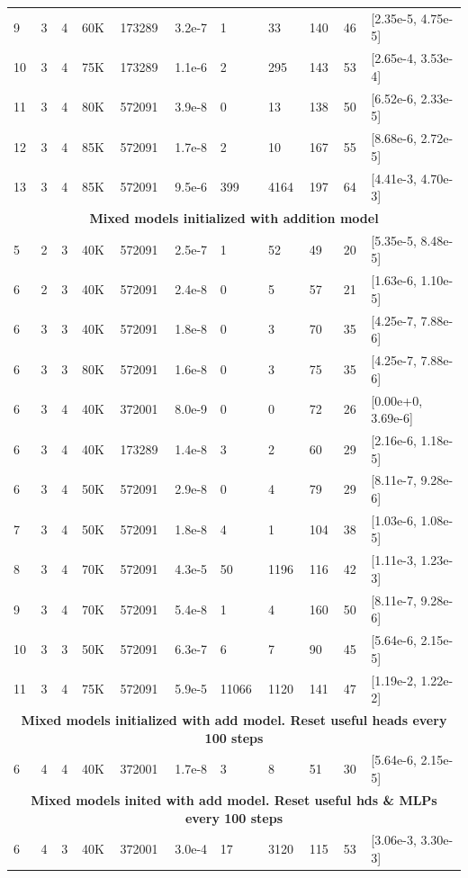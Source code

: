\documentclass[11pt]{article}
\begin{document}
\begin{table}[t]
\begin{tabularx}{\textwidth}{|p{0.3cm}|p{0.3cm}|p{0.3cm}|p{0.8cm}|p{0.9cm}|p{1cm}|p{1.4cm}|p{1.4cm}|p{0.8cm}|p{0.8cm}|X|}
    9 & 3 & 4 & 60K & 173289 & 3.2e-7 & 1 & 33 & 140 & 46 & [2.35e-5, 4.75e-5]\\
    10 & 3 & 4 & 75K & 173289 & 1.1e-6 & 2 & 295 & 143 & 53 & [2.65e-4, 3.53e-4]\\
    11 & 3 & 4 & 80K & 572091 & 3.9e-8 & 0 & 13 & 138 & 50 & [6.52e-6, 2.33e-5]\\
    12 & 3 & 4 & 85K & 572091 & 1.7e-8 & 2 & 10 & 167 & 55 & [8.68e-6, 2.72e-5]\\
    13 & 3 & 4 & 85K & 572091 & 9.5e-6 & 399 & 4164 & 197 & 64 & [4.41e-3, 4.70e-3]\\
    \hline
    \multicolumn{11}{|c|}{\textcolor{lightbrown}{\textbf{Mixed models initialized with addition model}}} \\
    \hline
    5 & 2 & 3 & 40K & 572091 & 2.5e-7 & 1 & 52 & 49 & 20 & [5.35e-5, 8.48e-5]\\
    6 & 2 & 3 & 40K & 572091 & 2.4e-8 & 0 & 5 & 57 & 21 & [1.63e-6, 1.10e-5]\\
    6 & 3 & 3 & 40K & 572091 & 1.8e-8 & 0 & 3 & 70 & 35 & [4.25e-7, 7.88e-6]\\
    6 & 3 & 3 & 80K & 572091 & 1.6e-8 & 0 & 3 & 75 & 35 & [4.25e-7, 7.88e-6]\\
    6 & 3 & 4 & 40K & 372001 & 8.0e-9 & 0 & 0 & 72 & 26 & [0.00e+0, 3.69e-6]\\
    6 & 3 & 4 & 40K & 173289 & 1.4e-8 & 3 & 2 & 60 & 29 & [2.16e-6, 1.18e-5]\\
    6 & 3 & 4 & 50K & 572091 & 2.9e-8 & 0 & 4 & 79 & 29 & [8.11e-7, 9.28e-6]\\
    7 & 3 & 4 & 50K & 572091 & 1.8e-8 & 4 & 1 & 104 & 38 & [1.03e-6, 1.08e-5]\\
    8 & 3 & 4 & 70K & 572091 & 4.3e-5 & 50 & 1196 & 116 & 42 & [1.11e-3, 1.23e-3]\\
    9 & 3 & 4 & 70K & 572091 & 5.4e-8 & 1 & 4 & 160 & 50 & [8.11e-7, 9.28e-6]\\
    10 & 3 & 3 & 50K & 572091 & 6.3e-7 & 6 & 7 & 90 & 45 & [5.64e-6, 2.15e-5]\\
    11 & 3 & 4 & 75K & 572091 & 5.9e-5 & 11066 & 1120 & 141 & 47 & [1.19e-2, 1.22e-2]\\
    \hline
    \multicolumn{11}{|c|}{\textcolor{lightbrown}{\textbf{Mixed models initialized with add model. Reset useful heads every 100 steps}}} \\
    \hline
    6 & 4 & 4 & 40K & 372001 & 1.7e-8 & 3 & 8 & 51 & 30 & [5.64e-6, 2.15e-5]\\
    \hline
    \multicolumn{11}{|c|}{\textcolor{lightbrown}{\textbf{Mixed models inited with add model. Reset useful hds \& MLPs every 100 steps}}} \\
    \hline
    6 & 4 & 3 & 40K & 372001 & 3.0e-4 & 17 & 3120 & 115 & 53 & [3.06e-3, 3.30e-3]\\
    \hline
  \end{tabularx}  
\end{table}
\end{document}
